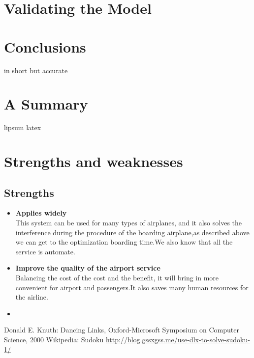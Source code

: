 \documentclass{mcmthesis}
\begin{document}
\section{Validating the Model}


\section{Conclusions}
in short but accurate

\section{A Summary}
\lipsum[6]
lipsum latex

\section{Strengths and weaknesses}
\lipsum[12]

\subsection{Strengths}
\begin{itemize}
	\item \textbf{Applies widely}\\
	This  system can be used for many types of airplanes, and it also
	solves the interference during  the procedure of the boarding
	airplane,as described above we can get to the  optimization
	boarding time.We also know that all the service is automate.
	\item \textbf{Improve the quality of the airport service}\\
	Balancing the cost of the cost and the benefit, it will bring in
	more convenient  for airport and passengers.It also saves many
	human resources for the airline. \item \textbf{}
\end{itemize}

\begin{thebibliography}{99}
 Donald E. Knuth: Dancing Links, Oxford-Microsoft Symposium on Computer Science, 2000
	Wikipedia: Sudoku
\url{http://blog.gssxgss.me/use-dlx-to-solve-sudoku-1/}
\end{thebibliography}
\end{document}
